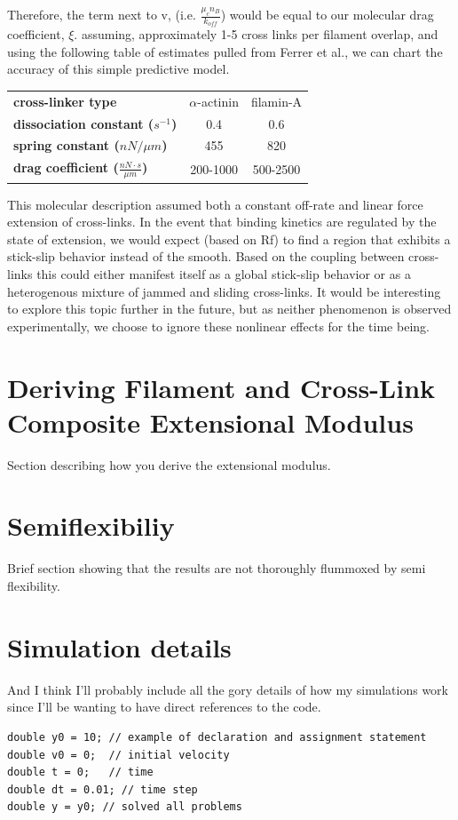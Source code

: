 \documentclass[pre,preprint]{revtex4-1}
\begin{document}
Therefore, the term next to v, (i.e. $\tfrac{\mu_c n_B}{k_{off}}$) would be equal to our molecular drag coefficient, $\xi$.  assuming, approximately 1-5 cross links per filament overlap, and using the following table of estimates pulled from Ferrer et al., we can chart the accuracy of this simple predictive model.

\begin{table}[h]
\begin{tabular}{| l | c | c |}
\hline
\textbf{cross-linker type} & $\alpha$-actinin & filamin-A  \\ \cline{1-1}
\textbf{dissociation constant ($s^{-1}$)} & 0.4 & 0.6 \\ \cline{1-1}
\textbf{spring constant ($nN / \mu m$)} & 455 & 820 \\ \cline{1-1}
\textbf{drag coefficient ($\tfrac{nN \cdot s}{\mu m}$)} & 200-1000 & 500-2500 \\ 
\hline
\end{tabular}
\end{table}



This molecular description assumed both a constant off-rate and linear force extension of cross-links.  In the event that binding kinetics are regulated by the state of extension, we would expect (based on Rf) to find a region that exhibits a stick-slip behavior instead of the smooth.  Based on the coupling between cross-links this could either manifest itself as a global stick-slip behavior or as a heterogenous mixture of jammed and sliding cross-links.  It would be interesting to explore this topic further in the future, but as neither phenomenon is observed experimentally, we choose to ignore these nonlinear effects for the time being.

\section{Deriving Filament and Cross-Link Composite Extensional Modulus}
\label{app_compos}
Section describing how you derive the extensional modulus.

\section{Semiflexibiliy}

Brief section showing that the results are not thoroughly flummoxed by semi flexibility.


\section{Simulation details}
And I think I'll probably include all the gory details of how my simulations work since I'll be wanting to have direct references to the code. 
\begin{verbatim}
double y0 = 10; // example of declaration and assignment statement
double v0 = 0;  // initial velocity
double t = 0;   // time
double dt = 0.01; // time step
double y = y0; // solved all problems
\end{verbatim}



\end{document}
